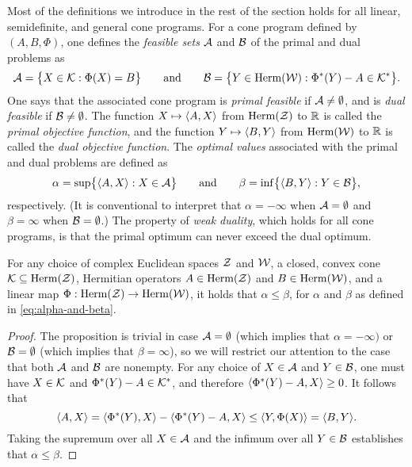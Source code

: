 Most of the definitions we introduce in the rest of the section holds for all linear, semidefinite, and general cone programs.
For a cone program defined by $(A,B,\Phi)$, one defines the 
\emph{feasible sets} $\mathcal{A}$ and $\mathcal{B}$ of the primal and dual problems as
\begin{equation}
  \mathcal{A} = \bigl\{ X \in \mathcal{K} : \Phi(X) = B\bigr\} 
  \qquad \text{and} \qquad 
  \mathcal{B} = \bigl\{ Y \in \mathrm{Herm}(\mathcal{W}) : \Phi^{\ast}(Y) - A \in \mathcal{K}^{\ast} \bigr\}.
\end{equation}
One says that the associated cone program is \emph{primal feasible} if 
$\mathcal{A} \neq \emptyset$, and is \emph{dual feasible} if $\mathcal{B} \neq \emptyset$. 
The function $X \mapsto \langle A , X\rangle$ from $\mathrm{Herm}(\mathcal{Z})$ to $\mathbb{R}$ is called the 
\emph{primal objective function}, and the function $Y \mapsto \langle B , Y\rangle$ from 
$\mathrm{Herm}(\mathcal{W})$ to $\mathbb{R}$ is called the \emph{dual objective function}.
The \emph{optimal values} associated with the primal and dual problems are
defined as
\begin{equation}
  \label{eq:alpha-and-beta}
  \alpha = \sup \bigl\{ \langle A , X\rangle : X \in \mathcal{A} \bigr\} 
  \qquad \text{and} \qquad 
  \beta = \inf \bigl\{ \langle B , Y\rangle : Y \in \mathcal{B} \bigr\},
\end{equation}
respectively.
(It is conventional to interpret that $\alpha = -\infty$ when $\mathcal{A} = \emptyset$
and $\beta = \infty$ when $\mathcal{B} = \emptyset$.)
The property of \emph{weak duality}, which holds for all cone programs, is
that the primal optimum can never exceed the dual optimum.

\begin{prop}
\label{prop:weak-duality-cone}
  For any choice of complex Euclidean spaces $\mathcal{Z}$ and $\mathcal{W}$, a closed, convex
  cone $\mathcal{K}\subseteq\mathrm{Herm}(\mathcal{Z})$, Hermitian operators $A\in\mathrm{Herm}(\mathcal{Z})$ and
  $B\in\mathrm{Herm}(\mathcal{W})$, and a linear map $\Phi:\mathrm{Herm}(\mathcal{Z})\rightarrow\mathrm{Herm}(\mathcal{W})$, it
  holds that $\alpha \leq \beta$, for $\alpha$ and $\beta$ as defined in
  \eqref{eq:alpha-and-beta}.
\end{prop}

\begin{proof}
The proposition is trivial in case $\mathcal{A} = \emptyset$ (which implies that 
$\alpha = -\infty)$ or $\mathcal{B} = \emptyset$ (which implies that $\beta = \infty$), 
so we will restrict our attention to the case that both $\mathcal{A}$ and $\mathcal{B}$ are 
nonempty. 
For any choice of $X \in \mathcal{A}$ and $Y \in \mathcal{B}$, one must have $X \in \mathcal{K}$ and
$\Phi^{\ast}(Y) - A \in \mathcal{K}^{\ast}$, and therefore
$\langle \Phi^{\ast}(Y) - A , X\rangle \geq 0$.
It follows that
\begin{equation}
  \langle A , X\rangle = \langle \Phi^{\ast}(Y) , X\rangle - \langle \Phi^{\ast}(Y) - A , X\rangle
  \leq \langle Y , \Phi(X)\rangle = \langle B , Y\rangle.
\end{equation}
Taking the supremum over all $X \in \mathcal{A}$ and the infimum over all 
$Y \in \mathcal{B}$ establishes that $\alpha \leq \beta$.
\end{proof}

